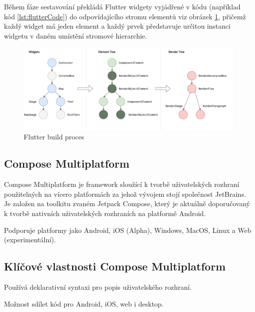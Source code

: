 Během fáze sestavování překládá Flutter widgety vyjádřené v kódu (například kód \ref{lst:flutterCode}) do odpovídajícího stromu elementů viz obrázek \ref{fig:flutter_trees}, přičemž každý widget má jeden element a 
každý prvek představuje určitou instanci widgetu v daném umístění stromové hierarchie. \cite*{flutterArchOverview}


\begin{figure}[H]
  \centering
  \includegraphics[width=1\textwidth]{flutter_trees.png}
  \caption{Flutter build proces}
  \label{fig:flutter_trees}
\end{figure}



\subsection{Compose Multiplatform}

Compose Multiplatform je framework sloužící k tvorbě uživatelských rozhraní použitelných na vícero platformách za 
jehož vývojem stojí společnost JetBrains. \cite{composeMultiplatform} Je založen na toolkitu zvaném Jetpack Compose, který je aktuálně 
doporučovaný k tvorbě nativních uživatelských rozhraních na platformě Android. \cite{jetpack}

Podporuje platformy jako Android, iOS (Alpha), Windows, MacOS, Linux a Web (experimentální). \cite{composeMultiplatform}

\medskip

\subsection*{Klíčové vlastnosti Compose Multiplatform}

Používá deklarativní syntaxi pro popis uživatelského rozhraní. \cite{KMPUseCases}

Možnost sdílet kód pro Android, iOS, web i desktop. \cite{composeMultiplatform}

